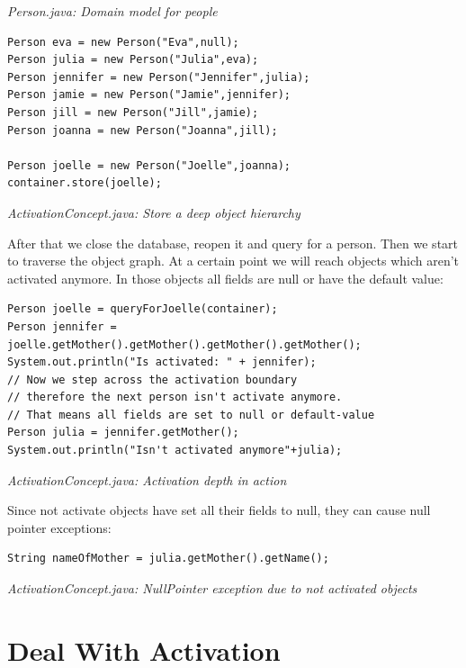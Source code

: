 {\small\itshape Person.java: Domain model for people\par}
\medskip

\begin{lstlisting}
Person eva = new Person("Eva",null);
Person julia = new Person("Julia",eva);
Person jennifer = new Person("Jennifer",julia);
Person jamie = new Person("Jamie",jennifer);
Person jill = new Person("Jill",jamie);
Person joanna = new Person("Joanna",jill);

Person joelle = new Person("Joelle",joanna);
container.store(joelle);
\end{lstlisting}

{\small\itshape ActivationConcept.java: Store a deep object hierarchy\par}
\medskip

After that we close the database, reopen it and query for a person. Then we start to traverse the object graph. At a certain point we will reach objects which aren't activated anymore. In those objects all fields are null or have the default value:

\begin{lstlisting}
Person joelle = queryForJoelle(container);
Person jennifer = joelle.getMother().getMother().getMother().getMother();
System.out.println("Is activated: " + jennifer);
// Now we step across the activation boundary
// therefore the next person isn't activate anymore.
// That means all fields are set to null or default-value
Person julia = jennifer.getMother();
System.out.println("Isn't activated anymore"+julia);
\end{lstlisting}

{\small\itshape ActivationConcept.java: Activation depth in action\par}
\medskip

Since not activate objects have set all their fields to null, they can cause null pointer exceptions:

\begin{lstlisting}
String nameOfMother = julia.getMother().getName();
\end{lstlisting}

{\small\itshape ActivationConcept.java: NullPointer exception due to not activated objects\par}
\medskip

\section{Deal With Activation}
\label{tut:activation:dealwithactivation}

